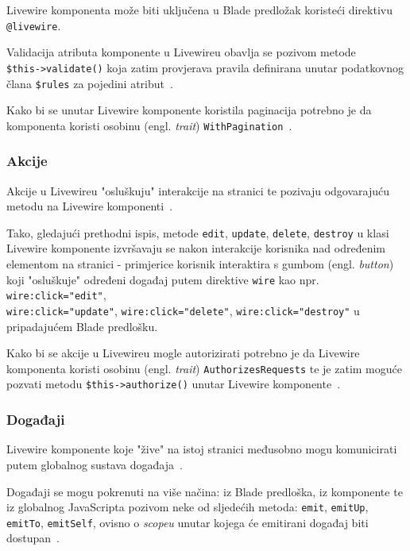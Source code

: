 Livewire komponenta može biti uključena u Blade predložak koristeći direktivu \\ \texttt{@livewire}.

Validacija atributa komponente u Livewireu obavlja se pozivom metode \\ \texttt{\$this->validate()} koja zatim provjerava pravila definirana unutar podatkovnog člana \texttt{\$rules} za pojedini atribut~\cite{livewireValidation}.

Kako bi se unutar Livewire komponente koristila paginacija potrebno je da komponenta koristi osobinu (engl. \textit{trait}) \texttt{WithPagination}~\cite{livewirePagination}.

\subsubsection{Akcije}
Akcije u Livewireu "osluškuju" interakcije na stranici te pozivaju odgovarajuću metodu na Livewire komponenti~\cite{livewireActions}.

Tako, gledajući prethodni ispis, metode \texttt{edit}, \texttt{update}, \texttt{delete}, \texttt{destroy} u klasi Livewire komponente izvršavaju se nakon interakcije korisnika nad određenim elementom na stranici - primjerice korisnik interaktira s gumbom (engl. \textit{button}) koji "osluškuje" određeni događaj putem direktive \texttt{wire} kao npr. \texttt{wire:click="edit"}, \\ \texttt{wire:click="update"},  \texttt{wire:click="delete"}, \texttt{wire:click="destroy"} u pripadajućem Blade predlošku.

Kako bi se akcije u Livewireu mogle autorizirati potrebno je da Livewire komponenta koristi osobinu (engl. \textit{trait}) \texttt{AuthorizesRequests} te je zatim moguće pozvati metodu \texttt{\$this->authorize()} unutar Livewire komponente~\cite{livewireAuthorization}. 

\subsubsection{Događaji}
Livewire komponente koje "žive" na istoj stranici međusobno mogu komunicirati putem globalnog sustava događaja~\cite{livewireEvents}.

Događaji se mogu pokrenuti na više načina: iz Blade predloška, iz komponente te iz globalnog JavaScripta pozivom neke od sljedećih metoda: \texttt{emit}, \texttt{emitUp}, \texttt{emitTo}, \texttt{emitSelf}, ovisno o \textit{scopeu} unutar kojega će emitirani događaj biti dostupan~\cite{livewireEvents}.

